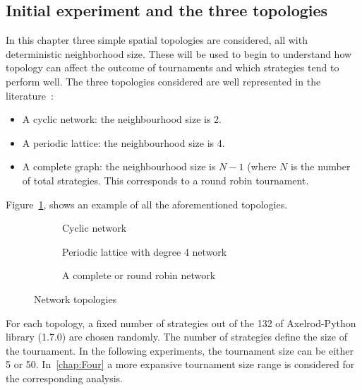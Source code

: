 \subsection{Initial experiment and the three topologies}
In this chapter three simple spatial topologies are considered, all with
deterministic neighborhood size. These will be used to begin to understand how
topology can affect the outcome of tournaments
and which strategies tend to perform well. The three topologies considered are
well represented in the literature~\cite{Axelrod1980a,Szabo2007,Lutz2013}:
\begin{itemize}
	\item A cyclic network: the neighbourhood size is 2.~\cite{Szabo2007}
	\item A periodic lattice: the neighbourhood size is 4.~\cite{Lutz2013}
	\item A complete graph: the neighbourhood size is \(N-1\) (where \(N\) is
	      the number of total strategies. This corresponds to a round robin
	      tournament.~\cite{Axelrod1980a}
\end{itemize}

Figure~\ref{fig:networks}, shows an example of all the aforementioned topologies.

\begin{figure}[!hbtp]
	\centering
	\begin{subfigure}[h]{0.45\textwidth}
		\centering
		
		\caption{Cyclic network}
	\end{subfigure}
	\hfill
	\begin{subfigure}[h]{0.52\textwidth}\centering
		\centering
		
		\caption{Periodic lattice with degree 4 network}
	\end{subfigure}
	\hfill
	\begin{subfigure}[h]{0.52\textwidth}\centering
		\centering
		
		\caption{A complete or round robin network}
	\end{subfigure}
	\caption{Network topologies}
	\label{fig:networks}
\end{figure}

For each topology, a fixed number of strategies out of the 132 of Axelrod-Python
library (1.7.0) are chosen randomly. The number of strategies define the size of the
tournament. In the following experiments, the tournament size can be either
5 or 50. In~\autoref{chap:Four} a more expansive tournament size range is
considered for the corresponding analysis.

